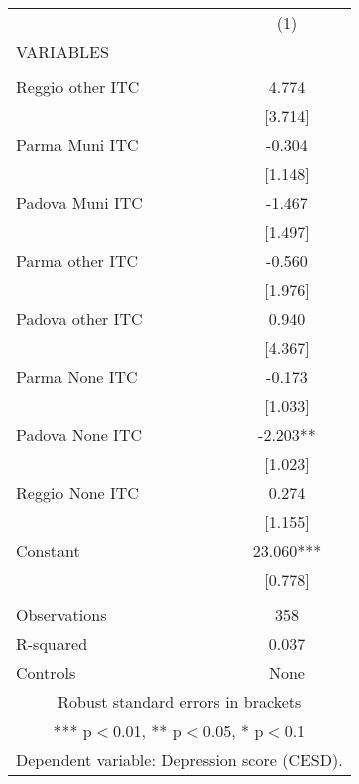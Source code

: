 \begin{tabular}{lc} \hline
 & (1) \\
VARIABLES &  \\ \hline
 &  \\
Reggio other ITC & 4.774 \\
 & [3.714] \\
Parma Muni ITC & -0.304 \\
 & [1.148] \\
Padova Muni ITC & -1.467 \\
 & [1.497] \\
Parma other ITC & -0.560 \\
 & [1.976] \\
Padova other ITC & 0.940 \\
 & [4.367] \\
Parma None ITC & -0.173 \\
 & [1.033] \\
Padova None ITC & -2.203** \\
 & [1.023] \\
Reggio None ITC & 0.274 \\
 & [1.155] \\
Constant & 23.060*** \\
 & [0.778] \\
 &  \\
Observations & 358 \\
R-squared & 0.037 \\
 Controls & None \\ \hline
\multicolumn{2}{c}{ Robust standard errors in brackets} \\
\multicolumn{2}{c}{ *** p$<$0.01, ** p$<$0.05, * p$<$0.1} \\
\multicolumn{2}{c}{ Dependent variable: Depression score (CESD).} \\
\end{tabular}
